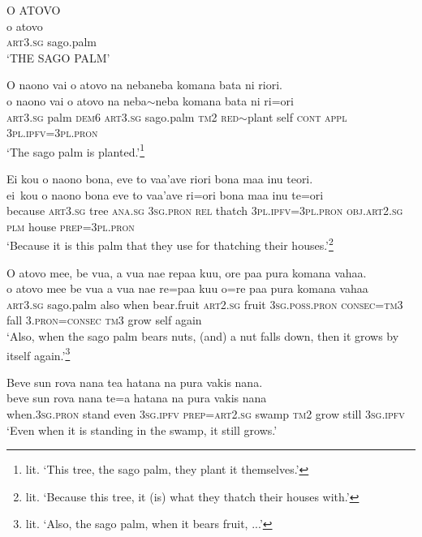\ea\label{ex:text2-1}
O ATOVO\\
\gll o	atovo\\
     \textsc{art}3.\textsc{sg}	sago.palm\\
\glt `THE SAGO PALM'
\z

\ea\label{ex:text2-2}
O naono vai o atovo na nebaneba komana bata ni riori.\\
\gll o	naono	vai	o	atovo	na	neba{$\sim$}neba	komana	bata	ni	ri=ori\\
     \textsc{art}3.\textsc{sg}	palm	\textsc{dem}6	\textsc{art}3.\textsc{sg}	sago.palm	\textsc{tm}2	\textsc{red}{$\sim$}plant	self	\textsc{cont}	\textsc{appl}	3\textsc{pl}.\textsc{ipfv}=3\textsc{pl}.\textsc{pron}\\
\glt `The sago palm is planted.'\footnote{lit. `This tree, the sago palm, they plant it themselves.'}
\z

\ea\label{ex:text2-3}
Ei kou o naono bona, eve to vaa'ave riori bona maa inu teori.\\
\gll ei~kou	o	naono	bona	eve	to	vaa'ave	ri=ori	bona	maa	inu	te=ori\\
     because	\textsc{art}3.\textsc{sg}	tree	\textsc{ana}.\textsc{sg}	3\textsc{sg}.\textsc{pron}	\textsc{rel}	thatch	3\textsc{pl}.\textsc{ipfv}=3\textsc{pl}.\textsc{pron}	\textsc{obj}.\textsc{art}2.\textsc{sg}	\textsc{plm}	house	\textsc{prep}=3\textsc{pl}.\textsc{pron}\\
\glt `Because it is this palm that they use for thatching their houses.'\footnote{lit. `Because this tree, it (is) what they thatch their houses with.'}
\z

\ea\label{ex:text2-4}
O atovo mee, be vua, a vua nae repaa kuu, ore paa pura komana vahaa.\\
\gll o	atovo	mee	be	vua	a	vua	nae	re=paa	kuu	o=re	paa	pura	komana	vahaa\\
     \textsc{art}3.\textsc{sg}	sago.palm	also	when	bear.fruit	\textsc{art}2.\textsc{sg}	fruit	3\textsc{sg}.\textsc{poss}.\textsc{pron}	\textsc{consec}=\textsc{tm}3	fall	3.\textsc{pron}=\textsc{consec}	\textsc{tm}3	grow	self	again\\
\glt `Also,  when the sago palm bears nuts, (and) a nut falls down, then it grows by itself again.'\footnote{lit. `Also, the sago palm, when it bears fruit, ...'}
\z

\ea\label{ex:text2-5}
Beve sun rova nana tea hatana na pura vakis nana.\\
\gll beve	sun	rova	nana	te=a	hatana	na	pura	vakis	nana\\
     when.3\textsc{sg}.\textsc{pron}	stand	even	3\textsc{sg}.\textsc{ipfv}	\textsc{prep}=\textsc{art}2.\textsc{sg}	swamp	\textsc{tm}2	grow	still	3\textsc{sg}.\textsc{ipfv}\\
\glt `Even when it is standing in the swamp, it still grows.'
\z

